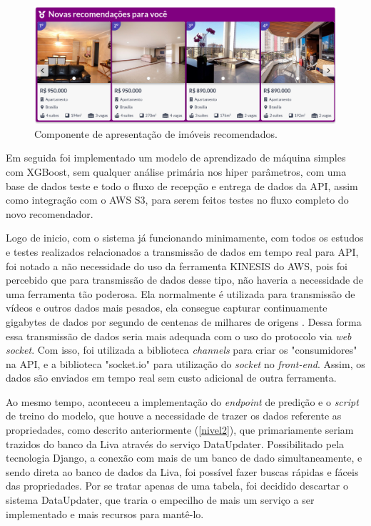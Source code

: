 \begin{figure}[H]
    \centering
    \includegraphics[scale=0.425]{figuras/desenvolvimento/componente_ml.png}
    \caption[Componente de apresentação de imóveis recomendados]{Componente de apresentação de imóveis recomendados.}
    \label{fig:componente_ml}
\end{figure}

Em seguida foi implementado um modelo de aprendizado de máquina simples com XGBoost, sem qualquer análise primária nos hiper parâmetros, com uma base de dados teste e todo o fluxo de recepção e entrega de dados da API, assim como integração com o AWS S3, para serem feitos testes no fluxo completo do novo recomendador.

Logo de inicio, com o sistema já funcionando minimamente, com todos os estudos e testes realizados relacionados a transmissão de dados em tempo real para API, foi notado a não necessidade do uso da ferramenta KINESIS do AWS, pois foi percebido que para transmissão de dados desse tipo, não haveria a necessidade de uma ferramenta tão poderosa. Ela normalmente é utilizada para transmissão de vídeos e outros dados mais pesados, ela consegue capturar continuamente gigabytes de dados por segundo de centenas de milhares de origens \cite{KINESIS:2019}. Dessa forma essa transmissão de dados seria mais adequada com o uso do protocolo via \textit{web socket}. Com isso, foi utilizada a biblioteca \textit{channels} para criar os "consumidores" na API, e a biblioteca "socket.io" para utilização do \textit{socket} no \textit{front-end}. Assim, os dados são enviados em tempo real sem custo adicional de outra ferramenta.

Ao mesmo tempo, aconteceu a implementação do \textit{endpoint} de predição e o \textit{script} de treino do modelo, que houve a necessidade de trazer os dados referente as propriedades, como descrito anteriormente (\ref{nivel2}), que primariamente seriam trazidos do banco da Liva através do serviço DataUpdater. Possibilitado pela tecnologia Django, a conexão com mais de um banco de dado simultaneamente, e sendo direta ao banco de dados da Liva, foi possível fazer buscas rápidas e fáceis das propriedades. Por se tratar apenas de uma tabela, foi decidido descartar o sistema DataUpdater, que traria o empecilho de mais um serviço a ser implementado e mais recursos para mantê-lo.

